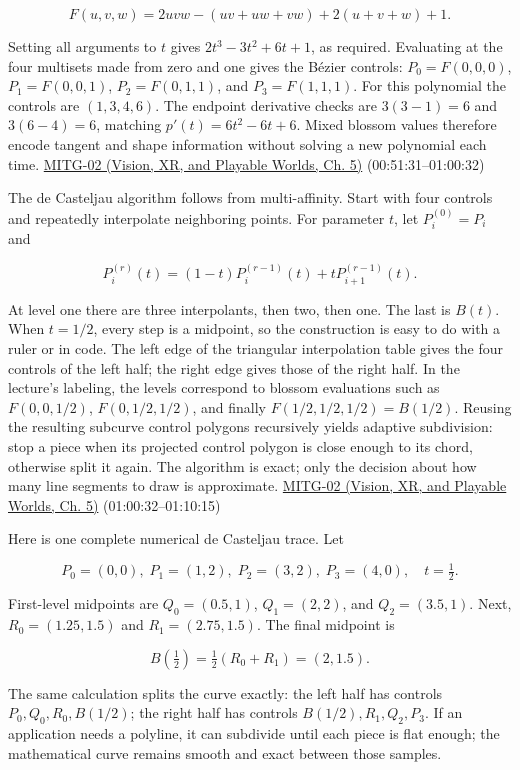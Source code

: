 \[
F(u,v,w)=2uvw-(uv+uw+vw)+2(u+v+w)+1.
\]

Setting all arguments to \(t\) gives \(2t^3-3t^2+6t+1\), as required. Evaluating at the four multisets made from zero and one gives the Bézier controls: \(P_0=F(0,0,0)\), \(P_1=F(0,0,1)\), \(P_2=F(0,1,1)\), and \(P_3=F(1,1,1)\). For this polynomial the controls are \((1,3,4,6)\). The endpoint derivative checks are \(3(3-1)=6\) and \(3(6-4)=6\), matching \(p'(t)=6t^2-6t+6\). Mixed blossom values therefore encode tangent and shape information without solving a new polynomial each time. \href{../07-Vision-XR-and-Playable-Worlds/main.pdf\#nameddest=04-visual-computing-ii-ch036-mitg-02---cubic-curves}{MITG-02 (Vision, XR, and Playable Worlds, Ch. 5)} (00:51:31--01:00:32)

The de Casteljau algorithm follows from multi-affinity. Start with four controls and repeatedly interpolate neighboring points. For parameter \(t\), let \(P_i^{(0)}=P_i\) and

\[
P_i^{(r)}(t)=(1-t)P_i^{(r-1)}(t)+tP_{i+1}^{(r-1)}(t).
\]

At level one there are three interpolants, then two, then one. The last is \(B(t)\). When \(t=1/2\), every step is a midpoint, so the construction is easy to do with a ruler or in code. The left edge of the triangular interpolation table gives the four controls of the left half; the right edge gives those of the right half. In the lecture's labeling, the levels correspond to blossom evaluations such as \(F(0,0,1/2)\), \(F(0,1/2,1/2)\), and finally \(F(1/2,1/2,1/2)=B(1/2)\). Reusing the resulting subcurve control polygons recursively yields adaptive subdivision: stop a piece when its projected control polygon is close enough to its chord, otherwise split it again. The algorithm is exact; only the decision about how many line segments to draw is approximate. \href{../07-Vision-XR-and-Playable-Worlds/main.pdf\#nameddest=04-visual-computing-ii-ch036-mitg-02---cubic-curves}{MITG-02 (Vision, XR, and Playable Worlds, Ch. 5)} (01:00:32--01:10:15)

Here is one complete numerical de Casteljau trace. Let

\[
P_0=(0,0),\; P_1=(1,2),\; P_2=(3,2),\; P_3=(4,0),\quad t=\tfrac12.
\]

First-level midpoints are \(Q_0=(0.5,1)\), \(Q_1=(2,2)\), and \(Q_2=(3.5,1)\). Next, \(R_0=(1.25,1.5)\) and \(R_1=(2.75,1.5)\). The final midpoint is

\[
B(\tfrac12)=\tfrac12(R_0+R_1)=(2,1.5).
\]

The same calculation splits the curve exactly: the left half has controls \(P_0,Q_0,R_0,B(1/2)\); the right half has controls \(B(1/2),R_1,Q_2,P_3\). If an application needs a polyline, it can subdivide until each piece is flat enough; the mathematical curve remains smooth and exact between those samples.

